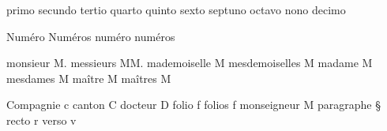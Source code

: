 primo               \noexpand{}%
secundo             \noexpand{}%
tertio              \noexpand{}%
quarto              \noexpand{}%
quinto              \noexpand{}%
sexto               \noexpand{}%
septuno             \noexpand{}%
octavo              \noexpand{}%
nono                \noexpand{}%
decimo              \noexpand{}%

{Numéro}            \noexpand\Numero%
{Numéros}           \noexpand\Numeros%
numéro              \noexpand\numero%
numéros             \noexpand\numeros%

monsieur            M.%
messieurs           MM.%
mademoiselle        M\noexpand{}%
mesdemoiselles      M\noexpand{}%
madame              M\noexpand{}%
mesdames            M\noexpand{}%
maître              M\noexpand{}%
maîtres             M\noexpand{}%

{Compagnie}         c\noexpand{}%
canton              C\noexpand{}%
docteur             D\noexpand{}%
folio               f\noexpand{}%
folios              f\noexpand{}%
monseigneur         M\noexpand{}%
paragraphe          \noexpand\S~%
recto               r\noexpand{}%
verso               v\noexpand{}%

